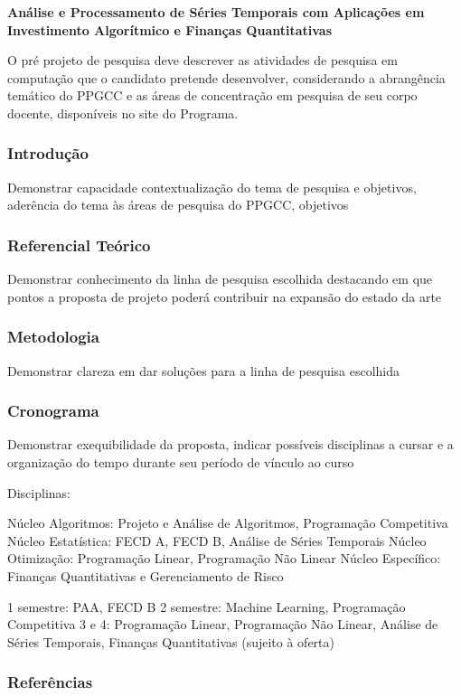 \documentclass{article}
\begin{document}
\textbf{\large Análise e Processamento de Séries Temporais com Aplicações em Investimento Algorítmico e Finanças Quantitativas}

O pré projeto de pesquisa deve descrever as atividades de pesquisa em computação
que o candidato pretende desenvolver, considerando a abrangência temático do
PPGCC e as áreas de concentração em pesquisa de seu corpo docente, disponíveis
no site do Programa.

\subsubsection*{Introdução}

Demonstrar capacidade contextualização do tema de pesquisa e objetivos,
aderência do tema às áreas de pesquisa do PPGCC, objetivos

\subsubsection*{Referencial Teórico}

Demonstrar conhecimento da linha de pesquisa escolhida destacando em que
pontos a proposta de projeto poderá contribuir na expansão do estado da arte

\subsubsection*{Metodologia}

Demonstrar clareza em dar soluções para a linha de pesquisa escolhida

\subsubsection*{Cronograma}

Demonstrar exequibilidade da proposta, indicar possíveis disciplinas a cursar
e a organização do tempo durante seu período de vínculo ao curso

Disciplinas:

Núcleo Algoritmos: Projeto e Análise de Algoritmos, Programação Competitiva
Núcleo Estatística: FECD A, FECD B, Análise de Séries Temporais
Núcleo Otimização: Programação Linear, Programação Não Linear
Núcleo Específico: Finanças Quantitativas e Gerenciamento de Risco

1 semestre: PAA, FECD B
2 semestre: Machine Learning, Programação Competitiva
3 e 4: Programação Linear, Programação Não Linear, Análise de Séries Temporais,
Finanças Quantitativas (sujeito à oferta)

\subsubsection*{Referências}
\end{document}
